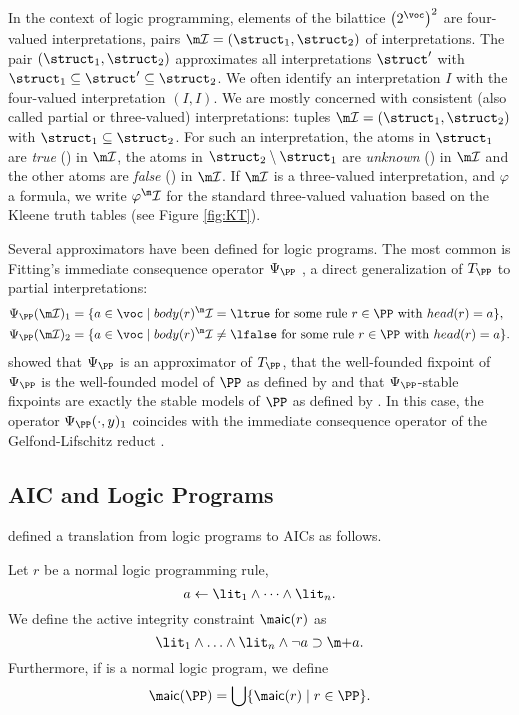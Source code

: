 	
	In the context of logic programming, elements of the bilattice $\left(2^\voc\right)^2$ are four-valued interpretations, pairs $\pstruct= (\struct_1,\struct_2)$ of interpretations.
The pair $(\struct_1,\struct_2)$ approximates all interpretations $\struct'$ with $\struct_1\subseteq \struct'\subseteq \struct_2$.
We often identify an interpretation $I$ with the four-valued interpretation $(I,I)$.
We are mostly concerned with consistent (also called partial or three-valued) interpretations: tuples $\pstruct=(\struct_1,\struct_2)$ with $\struct_1\subseteq\struct_2$. 
For such an interpretation, the atoms in $\struct_1$ are \emph{true} (\ltrue) in $\pstruct$, the atoms in $\struct_2\setminus\struct_1$ are \emph{unknown} (\lunkn) in $\pstruct$ and the other atoms are \emph{false} (\lfalse) in $\pstruct$. 
If $\pstruct$ is a three-valued interpretation, and $\varphi$ a formula, we write $\varphi^\pstruct$ for the standard three-valued valuation based on the Kleene truth tables (see Figure \ref{fig:KT}). 




Several approximators have been defined for logic programs. The most common is Fitting's immediate consequence operator $\Psi_\PP$ \cite{tcs/Fitting02}, a direct
generalization of $T_\PP$ to partial interpretations:
  \begin{align*}
    \Psi_\PP(\pstruct)_1 &=\{a\in \voc\mid body(r)^\pstruct=\ltrue \text{ for some rule $r\in \PP$ with }head(r)=a\},\\
    \Psi_\PP(\pstruct)_2 &=\{a\in \voc\mid body(r)^\pstruct\neq \lfalse \text{ for some rule $r\in \PP$ with }head(r)=a\}.
   \end{align*}
\citet{DeneckerMT00} showed that $\Psi_\PP$ is an approximator of $T_\PP$, that  the well-founded fixpoint of $\Psi_\PP$ is the well-founded model of $\PP$ as defined by \citeauthor{GelderRS91} and that $\Psi_\PP$-stable fixpoints are exactly the stable models of $\PP$ as defined by \citeauthor{iclp/GelfondL88}. In this case, 
the operator $\Psi_\PP(\cdot,y)_1$ coincides with the immediate consequence operator of the Gelfond-Lifschitz reduct \cite{iclp/GelfondL88}. 




\subsection{AIC and Logic Programs}
\citet{tplp/CaropreseT11} defined a translation from logic programs to AICs as follows. 
\begin{definition}
  \label{defn:aic-transf}
 Let $r$ be a normal logic programming rule, 
 \[a\leftarrow \lit_1  \land \dots \land \lit_n.\]
 We define the active integrity constraint $\aicop (r)$ as 
 \[\lit_1\wedge\ldots\wedge\lit_n\wedge\neg a \aicrule \add a.\]
 Furthermore, if \PP is a normal logic program, we define 
 \[\aicop(\PP)=\bigcup\{\aicop(r)\mid r\in \PP\}.\]
\end{definition}


